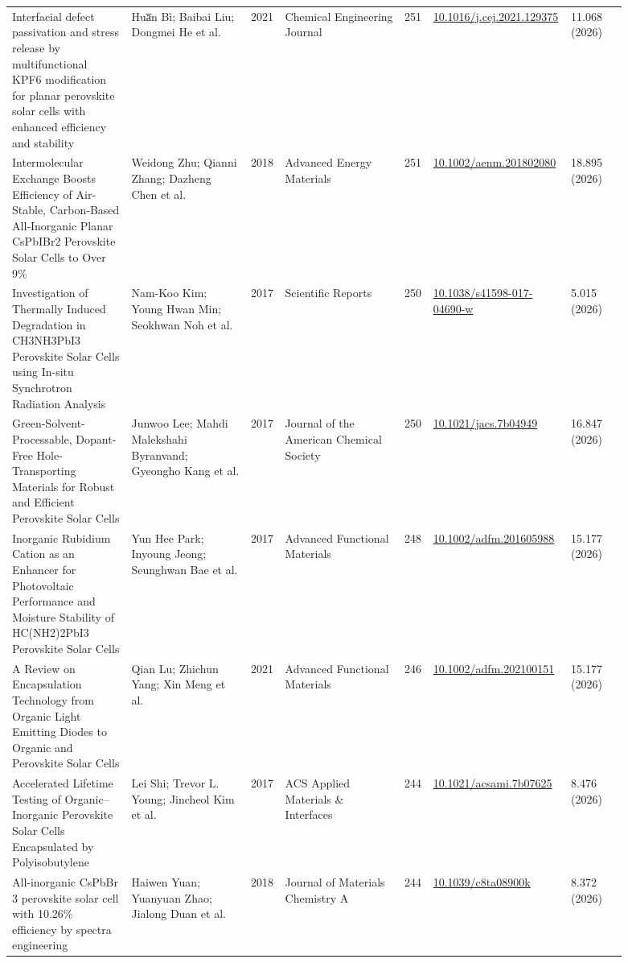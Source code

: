 \documentclass[10pt,a4paper]{article}
\begin{document}
{\begin{longtable}{p{0.197\linewidth}p{0.197\linewidth}p{0.043\linewidth}p{0.197\linewidth}p{0.043\linewidth}p{0.117\linewidth}p{0.098\linewidth}}
Interfacial defect passivation and stress release by multifunctional KPF6 modification for planar perovskite solar cells with enhanced efficiency and stability & Hua̅n Bì; Baibai Liu; Dongmei He et al. & 2021 & Chemical Engineering Journal & 251 & \href{https://doi.org/10.1016/j.cej.2021.129375}{10.1016/j.cej.2021.129375} & 11.068 (2026) \\
Intermolecular Exchange Boosts Efficiency of Air‐Stable, Carbon‐Based All‐Inorganic Planar CsPbIBr2 Perovskite Solar Cells to Over 9\% & Weidong Zhu; Qianni Zhang; Dazheng Chen et al. & 2018 & Advanced Energy Materials & 251 & \href{https://doi.org/10.1002/aenm.201802080}{10.1002/aenm.201802080} & 18.895 (2026) \\
Investigation of Thermally Induced Degradation in CH3NH3PbI3 Perovskite Solar Cells using In-situ Synchrotron Radiation Analysis & Nam-Koo Kim; Young Hwan Min; Seokhwan Noh et al. & 2017 & Scientific Reports & 250 & \href{https://doi.org/10.1038/s41598-017-04690-w}{10.1038/s41598-017-04690-w} & 5.015 (2026) \\
Green-Solvent-Processable, Dopant-Free Hole-Transporting Materials for Robust and Efficient Perovskite Solar Cells & Junwoo Lee; Mahdi Malekshahi Byranvand; Gyeongho Kang et al. & 2017 & Journal of the American Chemical Society & 250 & \href{https://doi.org/10.1021/jacs.7b04949}{10.1021/jacs.7b04949} & 16.847 (2026) \\
Inorganic Rubidium Cation as an Enhancer for Photovoltaic Performance and Moisture Stability of HC(NH2)2PbI3 Perovskite Solar Cells & Yun Hee Park; Inyoung Jeong; Seunghwan Bae et al. & 2017 & Advanced Functional Materials & 248 & \href{https://doi.org/10.1002/adfm.201605988}{10.1002/adfm.201605988} & 15.177 (2026) \\
A Review on Encapsulation Technology from Organic Light Emitting Diodes to Organic and Perovskite Solar Cells & Qian Lu; Zhichun Yang; Xin Meng et al. & 2021 & Advanced Functional Materials & 246 & \href{https://doi.org/10.1002/adfm.202100151}{10.1002/adfm.202100151} & 15.177 (2026) \\
Accelerated Lifetime Testing of Organic–Inorganic Perovskite Solar Cells Encapsulated by Polyisobutylene & Lei Shi; Trevor L. Young; Jincheol Kim et al. & 2017 & ACS Applied Materials \& Interfaces & 244 & \href{https://doi.org/10.1021/acsami.7b07625}{10.1021/acsami.7b07625} & 8.476 (2026) \\
All-inorganic CsPbBr 3 perovskite solar cell with 10.26\% efficiency by spectra engineering & Haiwen Yuan; Yuanyuan Zhao; Jialong Duan et al. & 2018 & Journal of Materials Chemistry A & 244 & \href{https://doi.org/10.1039/c8ta08900k}{10.1039/c8ta08900k} & 8.372 (2026) \\

\end{longtable}}
\end{document}
